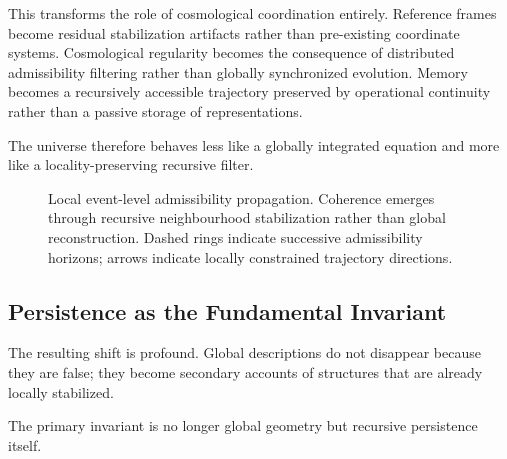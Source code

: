\documentclass[12pt, a4paper]{article}
\begin{document}
This transforms the role of cosmological coordination entirely. Reference
frames become residual stabilization artifacts rather than pre-existing
coordinate systems. Cosmological regularity becomes the consequence of
distributed admissibility filtering rather than globally synchronized
evolution. Memory becomes a recursively accessible trajectory preserved by
operational continuity rather than a passive storage of representations.

The universe therefore behaves less like a globally integrated equation and
more like a locality-preserving recursive filter.

\begin{figure}[H]
\centering
{}
\caption{Local event-level admissibility propagation. Coherence emerges
through recursive neighbourhood stabilization rather than global
reconstruction. Dashed rings indicate successive admissibility horizons;
arrows indicate locally constrained trajectory directions.}
\end{figure}

\subsection{Persistence as the Fundamental Invariant}

The resulting shift is profound. Global descriptions do not disappear because
they are false; they become secondary accounts of structures that are already
locally stabilized.

The primary invariant is no longer global geometry but recursive persistence
itself.
\end{document}

